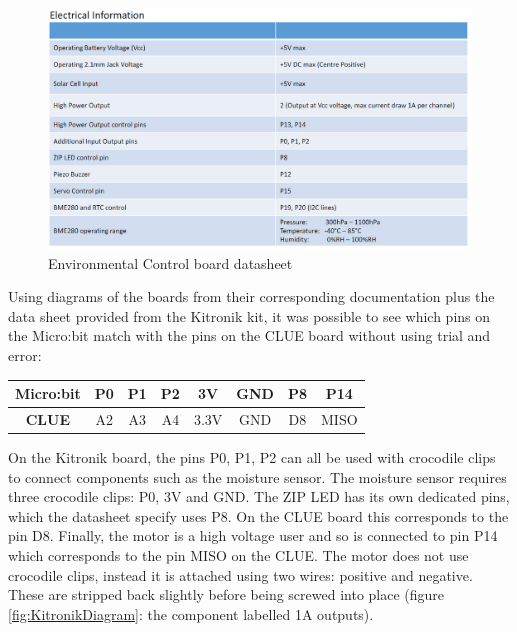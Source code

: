 \begin{figure}[H]
    \centering
    \includegraphics[scale=0.46]{Report/Images/KitronikInfoSheet.png}
    \caption{Environmental Control board datasheet \cite{kitronikBoard}}
    \label{fig:KitronikDatasheet}
\end{figure}

Using diagrams of the boards from their corresponding documentation plus the data sheet provided from the Kitronik kit, it was possible to see which pins on the Micro:bit match with the pins on the CLUE board without using trial and error:

\begin{center}
\begin{tabular}{| c | c | c | c | c | c | c | c |} 
    \hline
    \textbf{Micro:bit} & P0 & P1 & P2 & 3V & GND & P8 & P14\\
    \hline
    \textbf{CLUE} & A2 & A3 & A4 & 3.3V & GND & D8 & MISO\\
    \hline
\end{tabular}
\end{center}

On the Kitronik board, the pins P0, P1, P2 can all be used with crocodile clips to connect components such as the moisture sensor. The moisture sensor requires three crocodile clips: P0, 3V and GND. The ZIP LED has its own dedicated pins, which the datasheet specify uses P8. On the CLUE board this corresponds to the pin D8. Finally, the motor is a high voltage user and so is connected to pin P14 which corresponds to the pin MISO on the CLUE. The motor does not use crocodile clips, instead it is attached using two wires: positive and negative. These are stripped back slightly before being screwed into place (figure \ref{fig:KitronikDiagram}: the component labelled 1A outputs).

